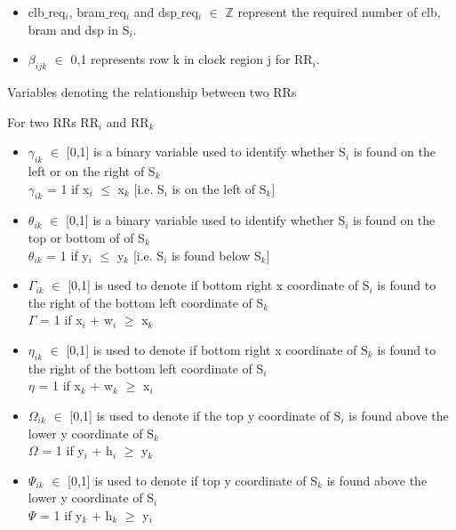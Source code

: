 \documentclass[conference]{IEEEtran}
\begin{document}
\begin{itemize}
\item clb$\_$req$_i$, bram$\_$req$_i$ and dsp$\_$req$_i$ $\in$ $\mathbb{Z}$ represent the required number of clb, bram and dsp in S$_i$.
\end{itemize}

\begin{itemize}
\item $\beta_{ijk}$ $\in$ {0,1} represents row k in clock region j for RR$_i$.
\end{itemize}

\hfill \break
Variables denoting the relationship between two RRs 

For two RRs RR$_i$ and RR$_k$ 
\begin{itemize}
\item $\gamma_{ik}$ $\in$ [0,1] is a binary variable used to identify whether S$_i$ is found on the left or on the right of S$_k$\\
$\gamma_{ik}$ = 1 if x$_i$ $\leq$ x$_k$ [i.e. S$_i$ is on the left of S$_k$]

\item $\theta_{ik}$ $\in$ [0,1] is a binary variable used to identify whether S$_i$ is found on the top or bottom of of S$_k$\\
$\theta_{ik}$ = 1 if y$_i$ $\leq$ y$_k$ [i.e. S$_i$ is found below S$_k$]

\item $\Gamma_{ik}$ $\in$ [0,1] is used to denote if bottom right x coordinate of S$_i$ is found to the right of the bottom left coordinate of S$_k$ \\
$\Gamma$ = 1 if x$_i$ + w$_i$ $\geq$ x$_k$

\item $\eta_{ik}$ $\in$ [0,1] is used to denote if bottom right x coordinate of S$_k$ is found to the right of the bottom left coordinate of S$_i$ \\
$\eta$ = 1 if x$_k$ + w$_k$ $\geq$ x$_i$

\item $\Omega_{ik}$ $\in$ [0,1] is used to denote if the top y coordinate of S$_i$ is found above the lower y coordinate of S$_k$ \\
$\Omega$ = 1 if y$_i$ + h$_i$ $\geq$ y$_k$

\item $\Psi_{ik}$ $\in$ [0,1] is used to denote if top y coordinate of S$_k$ is found above the lower y coordinate of S$_i$ \\
$\Psi$ = 1 if y$_k$ + h$_k$ $\geq$ y$_i$



\end{itemize}
\end{document}
